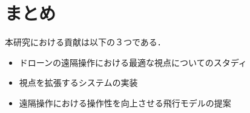\section{まとめ}
本研究における貢献は以下の３つである．
\begin{itemize}
 \item ドローンの遠隔操作における最適な視点についてのスタディ
 \item 視点を拡張するシステムの実装
 \item 遠隔操作における操作性を向上させる飛行モデルの提案
\end{itemize}


